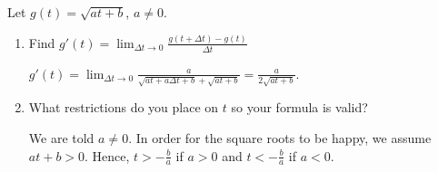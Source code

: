 \documentclass{ximera}
\begin{document}
\begin{problem} Let $g(t) = \sqrt{at+b}$, $a \neq 0$. 

\begin{enumerate}

\item Find  $g'(t) =  \lim_{\Delta t \rightarrow 0} \frac{g(t+\Delta t) - g(t)}{\Delta t}$ 

\begin{solution}
 $g'(t) = \lim_{\Delta t \rightarrow 0} \frac{a}{\sqrt{at+a\Delta t+b} + \sqrt{at+b}} = \frac{a}{2 \sqrt{at+b}}$.  
\end{solution}

\item What restrictions do you place on $t$ so your formula is valid?

\begin{solution}
We are told $a \neq 0$.  In order for the square roots to be happy, we assume $at + b > 0$.  Hence,   $t >  - \frac{b}{a}$ if $a>0$ and $t < -  \frac{b}{a}$ if $a<0$. 
\end{solution}

\end{enumerate}

\end{problem}
\end{document}
